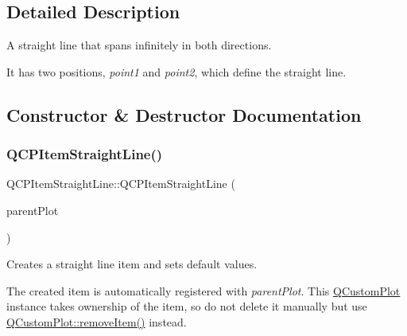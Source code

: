 \subsection{Detailed Description}
A straight line that spans infinitely in both directions. 

 It has two positions, {\itshape point1} and {\itshape point2}, which define the straight line. 

\subsection{Constructor \& Destructor Documentation}
\mbox{\label{class_q_c_p_item_straight_line_a41fd2e1f006983449eca9830930c3b10}} 
\subsubsection{\texorpdfstring{Q\+C\+P\+Item\+Straight\+Line()}{QCPItemStraightLine()}}
{\footnotesize\ttfamily Q\+C\+P\+Item\+Straight\+Line\+::\+Q\+C\+P\+Item\+Straight\+Line (\begin{DoxyParamCaption}\item[{\hyperlink{class_q_custom_plot}{Q\+Custom\+Plot} $\ast$}]{parent\+Plot }\end{DoxyParamCaption})\hspace{0.3cm}{\ttfamily [explicit]}}

Creates a straight line item and sets default values.

The created item is automatically registered with {\itshape parent\+Plot}. This \hyperlink{class_q_custom_plot}{Q\+Custom\+Plot} instance takes ownership of the item, so do not delete it manually but use \hyperlink{class_q_custom_plot_ae04446557292551e8fb6e2c106e1848d}{Q\+Custom\+Plot\+::remove\+Item()} instead. \mbox{\label{class_q_c_p_item_straight_line_a1f0730759916ce203baeaad1ad2af3ea}} 

